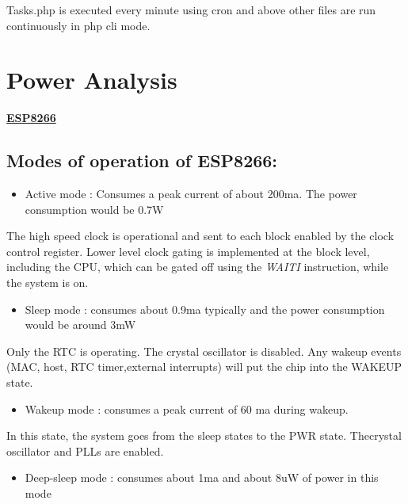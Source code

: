 \documentclass[16pt]{article}
\begin{document}
Tasks.php is executed every minute using cron and above other files are
run continuously in php cli mode.

\vspace{13cm}

\section{Power Analysis}
\vspace{0.5cm}

{\Large{\underline{\textbf{ESP8266}}}}

\vspace{0.2cm}

\subsection{Modes of operation of
ESP8266:}

\begin{itemize}

\item
  Active mode : Consumes a peak current of about 200ma. The power
  consumption would be 0.7W
\end{itemize}

The high speed clock is operational and sent to each block enabled by
the clock control register. Lower level clock gating is implemented at
the block level, including the CPU, which can be gated off using the
\emph{WAITI} instruction, while the system is on.

\begin{itemize}

\item
  Sleep mode : consumes about 0.9ma typically and the power consumption
  would be around 3mW
\end{itemize}

Only the RTC is operating. The crystal oscillator is disabled. Any
wakeup events (MAC, host, RTC timer,external interrupts) will put the
chip into the WAKEUP state.

\begin{itemize}

\item
  Wakeup mode : consumes a peak current of 60 ma during wakeup.
\end{itemize}

In this state, the system goes from the sleep states to the PWR state.
Thecrystal oscillator and PLLs are enabled.

\begin{itemize}

\item
  Deep-sleep mode : consumes about 1ma and about 8uW of power in this
  mode
\end{itemize}
\end{document}
